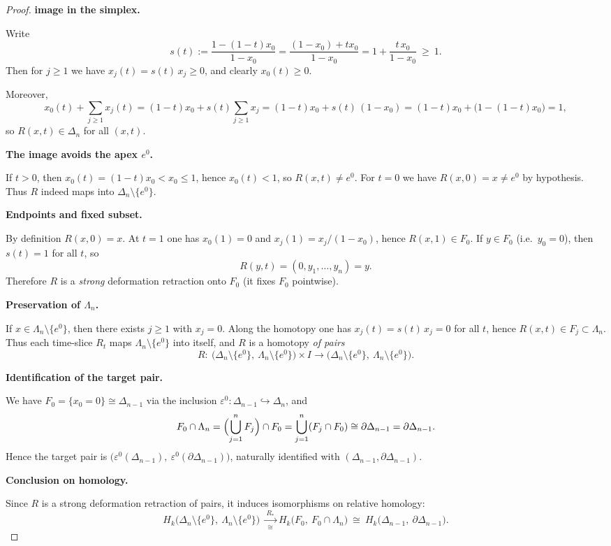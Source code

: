 \begin{proof}
\textbf{image in the simplex.}

Write
\[
s(t):=\dfrac{1-(1-t)x_0}{\,1-x_0\,}=\dfrac{(1-x_0)+t x_0}{1-x_0}=1+\dfrac{t\,x_0}{1-x_0}\ \ge\ 1 .
\]
Then for $j\ge 1$ we have $x_j(t)=s(t)\,x_j\ge 0$, and clearly $x_0(t)\ge 0$.

Moreover,
\[
x_0(t)+\sum_{j\ge 1}x_j(t)=(1-t)x_0 + s(t)\sum_{j\ge 1}x_j
= (1-t)x_0 + s(t)\,(1-x_0)
= (1-t)x_0 + \bigl(1-(1-t)x_0\bigr)=1,
\]
so $R(x,t)\in\Delta_n$ for all $(x,t)$.

\textbf{The image avoids the apex $e^0$.}

If $t>0$, then $x_0(t)=(1-t)x_0< x_0\le 1$, hence $x_0(t)<1$, so $R(x,t)\neq e^0$.
For $t=0$ we have $R(x,0)=x\neq e^0$ by hypothesis. Thus $R$ indeed maps into $\Delta_n\setminus\{e^0\}$.

\textbf{Endpoints and fixed subset.}

By definition $R(x,0)=x$.
At $t=1$ one has $x_0(1)=0$ and $x_j(1)=x_j/(1-x_0)$, hence $R(x,1)\in F_0$.
If $y\in F_0$ (i.e.\ $y_0=0$), then $s(t)=1$ for all $t$, so
\[
R(y,t)=(0,y_1,\dots,y_n)=y.
\]
Therefore $R$ is a \emph{strong} deformation retraction onto $F_0$ (it fixes $F_0$ pointwise).

\textbf{Preservation of $\Lambda_n$.}

If $x\in \Lambda_n\setminus\{e^0\}$, then there exists $j\ge 1$ with $x_j=0$.
Along the homotopy one has $x_j(t)=s(t)\,x_j=0$ for all $t$, hence $R(x,t)\in F_j\subset \Lambda_n$.
Thus each time-slice $R_t$ maps $\Lambda_n\setminus\{e^0\}$ into itself, and
$R$ is a homotopy \emph{of pairs}
\[
R:\ \bigl(\Delta_n\setminus\{e^0\},\ \Lambda_n\setminus\{e^0\}\bigr)\times I
\longrightarrow \bigl(\Delta_n\setminus\{e^0\},\ \Lambda_n\setminus\{e^0\}\bigr).
\]

\textbf{Identification of the target pair.}

We have $F_0=\{x_0=0\}\cong \Delta_{n-1}$ via the inclusion $\varepsilon^0:\Delta_{n-1}\hookrightarrow \Delta_n$,
and
\[
F_0\cap \Lambda_n
=\Bigl(\bigcup_{j=1}^n F_j\Bigr)\cap F_0
=\bigcup_{j=1}^n (F_j\cap F_0)
\cong \partial\Delta_{n-1}=\partial\Delta_{n-1}.
\]
Hence the target pair is $\bigl(\varepsilon^0(\Delta_{n-1}),\ \varepsilon^0(\partial\Delta_{n-1})\bigr)$,
naturally identified with $(\Delta_{n-1},\partial\Delta_{n-1})$.

\textbf{Conclusion on homology.}

Since $R$ is a strong deformation retraction of pairs, it induces isomorphisms on
relative homology:
\[
H_k\!\bigl(\Delta_n\setminus\{e^0\},\ \Lambda_n\setminus\{e^0\}\bigr)
\ \xrightarrow[\cong]{\ R_* \ }
H_k\!\bigl(F_0,\ F_0\cap\Lambda_n\bigr)
\ \cong\ H_k\!\bigl(\Delta_{n-1},\ \partial\Delta_{n-1}\bigr).
\]
\end{proof}

